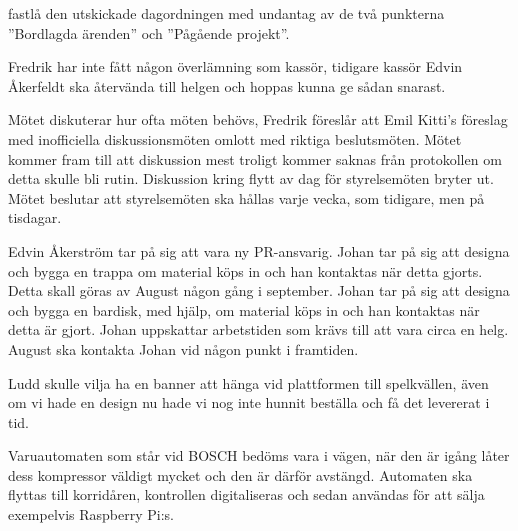 \documentclass{protokoll}
\begin{document}
\newpage  


\begin{beslut}
     \att fastlå den utskickade dagordningen med undantag av de två punkterna ''Bordlagda ärenden'' och ''Pågående projekt''.
\end{beslut}

Fredrik har inte fått någon överlämning som kassör, tidigare kassör Edvin Åkerfeldt ska återvända till helgen och hoppas kunna ge sådan snarast. 

Mötet diskuterar hur ofta möten behövs, Fredrik föreslår att Emil Kitti's föreslag med inofficiella diskussionsmöten omlott med riktiga beslutsmöten. Mötet kommer fram till att diskussion mest troligt kommer saknas från protokollen om detta skulle bli rutin. 
Diskussion kring flytt av dag för styrelsemöten bryter ut. 
Mötet beslutar att styrelsemöten ska hållas varje vecka, som tidigare, men på tisdagar. 

Edvin Åkerström tar på sig att vara ny PR-ansvarig.
Johan tar på sig att designa och bygga en trappa om material köps in och han kontaktas när detta gjorts. Detta skall göras av August någon gång i september.
Johan tar på sig att designa och bygga en bardisk, med hjälp, om material köps in och han kontaktas när detta är gjort. Johan uppskattar arbetstiden som krävs till att vara circa en helg. August ska kontakta Johan vid någon punkt i framtiden.

Ludd skulle vilja ha en banner att hänga vid plattformen till spelkvällen, även om vi hade en design nu hade vi nog inte hunnit beställa och få det levererat i tid.

Varuautomaten som står vid BOSCH bedöms vara i vägen, när den är igång låter dess kompressor väldigt mycket och den är därför avstängd. Automaten ska flyttas till korridåren, kontrollen digitaliseras och sedan användas för att sälja exempelvis Raspberry Pi:s.
\end{document}
